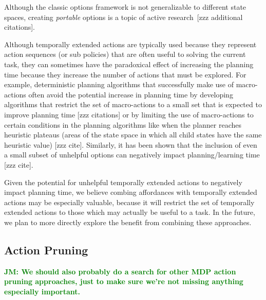 \documentclass[]{article}
\newcommand{\jmnote}[1]{\textcolor{Green}{\textbf{JM: #1}}}
\begin{document}
Although the classic options framework is not generalizable to different state spaces,
creating {\em portable} options is a topic of active research~\citep{konidaris07}[zzz additional citations].

Although temporally extended actions are typically used
because they represent action sequences (or sub policies) that are often useful to solving
the current task, they can sometimes have the paradoxical effect
of increasing the planning time because they increase the number of actions that must be explored.
For example, deterministic planning algorithms that successfully make use of macro-actions often avoid the potential increase
in planning time by developing algorithms that restrict the set of macro-actions to a small set that is expected to improve planning time [zzz citations] or by limiting the use of macro-actions to certain conditions
in the planning algorithms like when the planner reaches heuristic plateaus (areas of the state space in which all child states have the same heuristic value) [zzz cite]. Similarly, it has been shown that the inclusion
of even a small subset of unhelpful options can negatively impact planning/learning time [zzz cite].

Given the potential for unhelpful temporally extended actions to negatively impact planning time, we believe combing affordances with temporally extended actions
may be especially valuable, because it will restrict the set of temporally extended actions to those
which may actually be useful to a task. In the future, we plan to more directly explore the benefit from combining
these approaches.



\subsection{Action Pruning}
\jmnote{We should also probably do a search for other MDP action pruning approaches, just to
make sure we're not missing anything especially important.}
\end{document}
